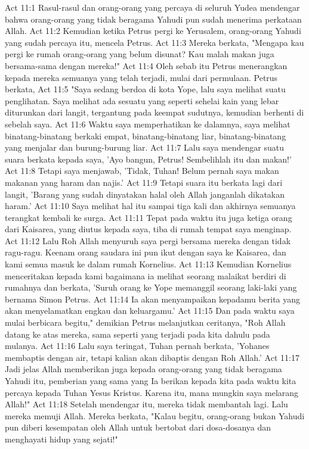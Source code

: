 Act 11:1  Rasul-rasul dan orang-orang yang percaya di seluruh Yudea mendengar bahwa orang-orang yang tidak beragama Yahudi pun sudah menerima perkataan Allah.
Act 11:2  Kemudian ketika Petrus pergi ke Yerusalem, orang-orang Yahudi yang sudah percaya itu, mencela Petrus.
Act 11:3  Mereka berkata, "Mengapa kau pergi ke rumah orang-orang yang belum disunat? Kau malah makan juga bersama-sama dengan mereka!"
Act 11:4  Oleh sebab itu Petrus menerangkan kepada mereka semuanya yang telah terjadi, mulai dari permulaan. Petrus berkata,
Act 11:5  "Saya sedang berdoa di kota Yope, lalu saya melihat suatu penglihatan. Saya melihat ada sesuatu yang seperti sehelai kain yang lebar diturunkan dari langit, tergantung pada keempat sudutnya, kemudian berhenti di sebelah saya.
Act 11:6  Waktu saya memperhatikan ke dalamnya, saya melihat binatang-binatang berkaki empat, binatang-binatang liar, binatang-binatang yang menjalar dan burung-burung liar.
Act 11:7  Lalu saya mendengar suatu suara berkata kepada saya, 'Ayo bangun, Petrus! Sembelihlah itu dan makan!'
Act 11:8  Tetapi saya menjawab, 'Tidak, Tuhan! Belum pernah saya makan makanan yang haram dan najis.'
Act 11:9  Tetapi suara itu berkata lagi dari langit, 'Barang yang sudah dinyatakan halal oleh Allah janganlah dikatakan haram.'
Act 11:10  Saya melihat hal itu sampai tiga kali dan akhirnya semuanya terangkat kembali ke surga.
Act 11:11  Tepat pada waktu itu juga ketiga orang dari Kaisarea, yang diutus kepada saya, tiba di rumah tempat saya menginap.
Act 11:12  Lalu Roh Allah menyuruh saya pergi bersama mereka dengan tidak ragu-ragu. Keenam orang saudara ini pun ikut dengan saya ke Kaisarea, dan kami semua masuk ke dalam rumah Kornelius.
Act 11:13  Kemudian Kornelius menceritakan kepada kami bagaimana ia melihat seorang malaikat berdiri di rumahnya dan berkata, 'Suruh orang ke Yope memanggil seorang laki-laki yang bernama Simon Petrus.
Act 11:14  Ia akan menyampaikan kepadamu berita yang akan menyelamatkan engkau dan keluargamu.'
Act 11:15  Dan pada waktu saya mulai berbicara begitu," demikian Petrus melanjutkan ceritanya, "Roh Allah datang ke atas mereka, sama seperti yang terjadi pada kita dahulu pada mulanya.
Act 11:16  Lalu saya teringat, Tuhan pernah berkata, 'Yohanes membaptis dengan air, tetapi kalian akan dibaptis dengan Roh Allah.'
Act 11:17  Jadi jelas Allah memberikan juga kepada orang-orang yang tidak beragama Yahudi itu, pemberian yang sama yang Ia berikan kepada kita pada waktu kita percaya kepada Tuhan Yesus Kristus. Karena itu, mana mungkin saya melarang Allah!"
Act 11:18  Setelah mendengar itu, mereka tidak membantah lagi. Lalu mereka memuji Allah. Mereka berkata, "Kalau begitu, orang-orang bukan Yahudi pun diberi kesempatan oleh Allah untuk bertobat dari dosa-dosanya dan menghayati hidup yang sejati!"
